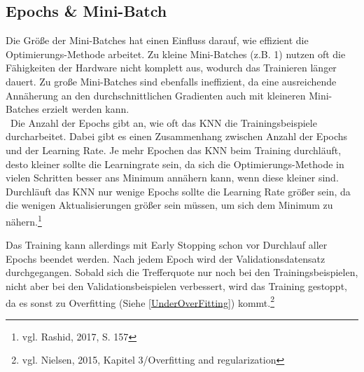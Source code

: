 \documentclass[a4paper,12pt,ngerman,oneside]{scrreprt}	%
\begin{document}
			\subsection{Epochs \& Mini-Batch}\label{EpochsUndMiniBatch}
			Die Größe der Mini-Batches hat einen Einfluss darauf, wie effizient die Optimierungs-Methode arbeitet. Zu kleine Mini-Batches (z.B. 1) nutzen oft die Fähigkeiten der Hardware nicht komplett aus, wodurch das Trainieren länger dauert. Zu große Mini-Batches sind ebenfalls ineffizient, da eine ausreichende Annäherung an den durchschnittlichen Gradienten auch mit kleineren Mini-Batches erzielt werden kann.
			\\\
			Die Anzahl der Epochs gibt an, wie oft das KNN die Trainingsbeispiele durcharbeitet. Dabei gibt es einen Zusammenhang zwischen Anzahl der Epochs und der Learning Rate. Je mehr Epochen das KNN beim Training durchläuft, desto kleiner sollte die Learningrate sein, da sich die Optimierungs-Methode in vielen Schritten besser ans Minimum annähern kann, wenn diese kleiner sind. Durchläuft das KNN nur wenige Epochs sollte die Learning Rate größer sein, da die wenigen Aktualisierungen größer sein müssen, um sich dem Minimum zu nähern.\footnote{vgl. Rashid, 2017, S. 157}
			
			Das Training kann allerdings mit Early Stopping schon vor Durchlauf aller Epochs beendet werden. Nach jedem Epoch wird der Validationsdatensatz durchgegangen. Sobald sich die Trefferquote nur noch bei den Trainingsbeispielen, nicht aber bei den Validationsbeispielen verbessert, wird das Training gestoppt, da es sonst zu Overfitting (Siehe \ref{UnderOverFitting}) kommt.\footnote{vgl. Nielsen, 2015, Kapitel 3/Overfitting and regularization}
\end{document}
